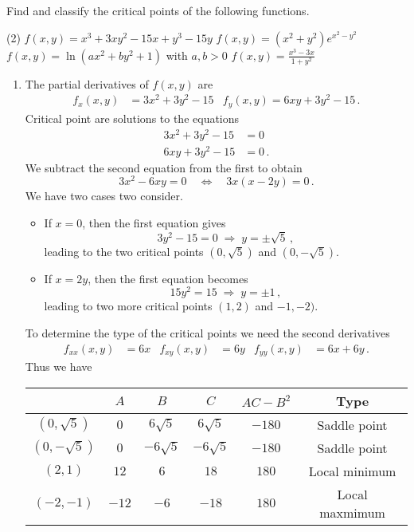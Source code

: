 \begin{question}
Find and classify the critical points of the following functions.
\begin{tasks}(2)
\task
$f(x,y) = x^3+3xy^2-15x+y^3-15y$
\task
$f(x,y) = (x^2+y^2)e^{x^2-y^2}$
\task
$f(x,y) = \ln(ax^2 + by^2 + 1)$ with $a,b > 0$
\task
$f(x,y) = \frac{x^3-3x}{1+y^2}$
\end{tasks}
\end{question}

\begin{solution}
\begin{enumerate}
\item
The partial derivatives of $f(x,y)$ are
\begin{align*}
f_x(x,y) &= 3x^2+3y^2-15 &
f_y(x,y) = 6xy+3y^2-15 \,.
\end{align*}
Critical point are solutions to the equations
\begin{align*}
3x^2+3y^2-15 &= 0 \\
6xy+3y^2-15 &= 0\,.
\end{align*}
We subtract the second equation from the first to obtain
\[
3x^2 - 6xy = 0
\quad\Leftrightarrow\quad
3x \left(x-2y\right) = 0\,.
\]
We have two cases two consider.
\begin{itemize}
\item
If $x=0$, then the first equation gives
\[
3y^2 - 15 = 0\;\Rightarrow\; y = \pm \sqrt{5}\,,
\]
leading to the two critical points $\left(0, \sqrt 5\right)$ and $\left(0, -\sqrt 5\right)$.
\item
If $x=2y$, then the first equation becomes
\[
15y^2 = 15\;\Rightarrow\; y = \pm 1\,,
\]
leading to two more critical points $(1, 2)$ and $-1, -2)$.
\end{itemize}
To determine the type of the critical points we need the second derivatives
\begin{align*}
f_{xx}(x,y) &= 6x &
f_{xy}(x,y) &= 6y &
f_{yy}(x,y) &= 6x+6y\,.
\end{align*}
Thus we have
\begin{center}
\renewcommand{\arraystretch}{1.25}
\begin{tabular}{c|ccc|cc}
 & $A$ & $B$ & $C$ & $AC-B^2$ & Type \\ \hline
$\left(0, \sqrt 5\right)$ & $0$ & $6\sqrt{5}$ & $6\sqrt{5}$ & $-180$ & Saddle point \\
$\left(0, -\sqrt 5\right)$ &  $0$ & $-6\sqrt{5}$ & $-6\sqrt{5}$ & $-180$ & Saddle point \\
$\left(2,1 \right)$ &  $12$ & $6$ & $18$ & $180$ & Local minimum \\
$\left(-2,-1 \right)$ &  $-12$ & $-6$ & $-18$ & $180$ & Local maxmimum \\
\end{tabular}
\end{center}


\end{enumerate}
\end{solution}
